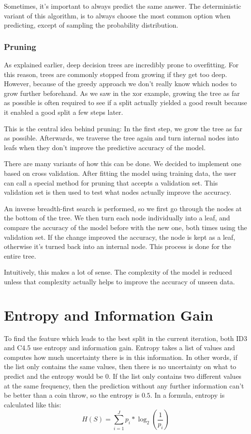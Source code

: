 \documentclass[a4paper]{article}
\begin{document}
Sometimes, it's important to always predict the same answer. The deterministic variant of this algorithm, is to always choose the most common option when predicting, except of sampling the probability distribution.

\subsubsection{Pruning}

As explained earlier, deep decision trees are incredibly prone to overfitting. For this reason, trees are commonly stopped from growing if they get too deep. However, because of the greedy approach we don't really know which nodes to grow further beforehand. As we saw in the xor example, growing the tree as far as possible is often required to see if a split actually yielded a good result because it enabled a good split a few steps later.

This is the central idea behind pruning: In the first step, we grow the tree as far as possible. Afterwards, we traverse the tree again and turn internal nodes into leafs when they don't improve the predictive accuracy of the model.

There are many variants of how this can be done. We decided to implement one based on cross validation. After fitting the model using training data, the user can call a special method for pruning that accepts a validation set. This validation set is then used to test what nodes actually improve the accuracy.

An inverse breadth-first search is performed, so we first go through the nodes at the bottom of the tree. We then turn each node individually into a leaf, and compare the accuracy of the model before with the new one, both times using the validation set. If the change improved the accuracy, the node is kept as a leaf, otherwise it's turned back into an internal node. This process is done for the entire tree.

Intuitively, this makes a lot of sense. The complexity of the model is reduced unless that complexity actually helps to improve the accuracy of unseen data.

\section{Entropy and Information Gain}

To find the feature which leads to the best split in the current iteration, both ID3 and C4.5 use entropy and information gain. Entropy takes a list of values and computes how much uncertainty there is in this information. In other words, if the list only contains the same values, then there is no uncertainty on what to predict and the entropy would be $0$. If the list only contains two different values at the same frequency, then the prediction without any further information can't be better than a coin throw, so the entropy is $0.5$. In a formula, entropy is calculated like this:
\[
	H(S) = \sum\limits_{i = 1}^J p_i * \log_2\left(\frac{1}{p_i}\right)
\]
\end{document}
